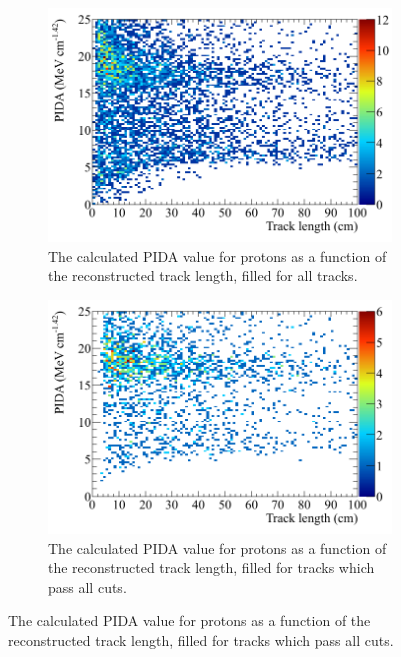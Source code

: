 \begin{figure}
  \centering
  \begin{subfigure}{0.48\textwidth}
        \centering
        \includegraphics[width=\textwidth]{ProtonEnrich_500V_v05_14_00_trackpmtrackdc_Proton_All_PIDA_TrackLen}
        \caption{The calculated PIDA value for protons as a function of the reconstructed track length, filled for all tracks.}
        \label{fig:CRY_PIDATrLen_Proton_All}
  \end{subfigure}%
  \hspace{0.03\textwidth}%
  \begin{subfigure}{0.48\textwidth}
        \centering
        \includegraphics[width=\textwidth]{ProtonEnrich_500V_v05_14_00_trackpmtrackdc_Proton_End_PIDA_TrackLen}
        \caption{The calculated PIDA value for protons as a function of the reconstructed track length, filled for tracks which pass all cuts.}

\end{subfigure}
\end{figure}
